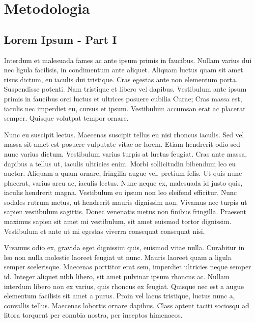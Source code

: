 \documentclass[
	12pt,				%
    oneside,			%
	a4paper,			%
	english,			%
	french,				%
	spanish,			%
	brazil				%
	]{abntex2}
\begin{document}
\chapter{Metodologia}

\section{Lorem Ipsum - Part I}

Interdum et malesuada fames ac ante ipsum primis in faucibus. Nullam varius dui nec ligula facilisis, in condimentum ante aliquet. Aliquam luctus quam sit amet risus dictum, eu iaculis dui tristique. Cras egestas ante non elementum porta. Suspendisse potenti. Nam tristique et libero vel dapibus. Vestibulum ante ipsum primis in faucibus orci luctus et ultrices posuere cubilia Curae; Cras massa est, iaculis nec imperdiet eu, cursus et ipsum. Vestibulum accumsan erat ac placerat semper. Quisque volutpat tempor ornare.

Nunc eu suscipit lectus. Maecenas suscipit tellus eu nisi rhoncus iaculis. Sed vel massa sit amet est posuere vulputate vitae ac lorem. Etiam hendrerit odio sed nunc varius dictum. Vestibulum varius turpis at luctus feugiat. Cras ante massa, dapibus a tellus ut, iaculis ultricies enim. Morbi sollicitudin bibendum leo eu auctor. Aliquam a quam ornare, fringilla augue vel, pretium felis. Ut quis nunc placerat, varius arcu ac, iaculis lectus. Nunc neque ex, malesuada id justo quis, iaculis hendrerit magna. Vestibulum eu ipsum non leo eleifend efficitur. Nunc sodales rutrum metus, ut hendrerit mauris dignissim non. Vivamus nec turpis ut sapien vestibulum sagittis. Donec venenatis metus non finibus fringilla. Praesent maximus sapien sit amet mi vestibulum, sit amet euismod tortor dignissim. Vestibulum et ante ut mi egestas viverra consequat consequat nisi.

Vivamus odio ex, gravida eget dignissim quis, euismod vitae nulla. Curabitur in leo non nulla molestie laoreet feugiat ut nunc. Mauris laoreet quam a ligula semper scelerisque. Maecenas porttitor erat sem, imperdiet ultricies neque semper id. Integer aliquet nibh libero, sit amet pulvinar ipsum rhoncus ac. Nullam interdum libero non ex varius, quis rhoncus ex feugiat. Quisque nec est a augue elementum facilisis sit amet a purus. Proin vel lacus tristique, luctus nunc a, convallis tellus. Maecenas lobortis ornare dapibus. Class aptent taciti sociosqu ad litora torquent per conubia nostra, per inceptos himenaeos.
\end{document}
